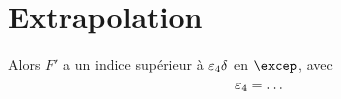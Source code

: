 
\section{Extrapolation} \label{sec:vojta-extrap}

\clearpage

\begin{prop}
  Alors \( F' \) a un indice supérieur à \( \varepsilon_4
    \delta \) en \( \excep \), avec
  \begin{equation}
    \varepsilon_4 = \dots
  \end{equation}
\end{prop}

\endinput

